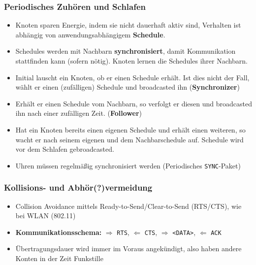 \documentclass{article} %
\begin{document}
\subsubsection{Periodisches Zuhören und Schlafen}
\begin{itemize}
	\item Knoten sparen Energie, indem sie nicht dauerhaft aktiv sind, Verhalten ist abhängig von anwendungsabhängigem \textbf{Schedule}.
	\item Schedules werden mit Nachbarn \textbf{synchronisiert}, damit Kommunikation stattfinden kann (sofern nötig).
	Knoten lernen die Schedules ihrer Nachbarn.
	\item Initial lauscht ein Knoten, ob er einen Schedule erhält.
	Ist dies nicht der Fall, wählt er einen (zufälligen) Schedule und broadcasted ihn (\textbf{Synchronizer})
	\item Erhält er einen Schedule vom Nachbarn, so verfolgt er diesen und broadcasted ihn nach einer zufälligen Zeit. (\textbf{Follower})
	\item Hat ein Knoten bereits einen eigenen Schedule und erhält einen weiteren, so wacht er nach seinem eigenen und dem Nachbarschedule auf.
	Schedule wird vor dem Schlafen gebroadcasted.
	\item Uhren müssen regelmäßig synchronisiert werden (Periodisches \texttt{SYNC}-Paket)
\end{itemize}
\subsubsection{Kollisions- und Abhör(?)vermeidung}
\begin{itemize}
	\item Collision Avoidance mittels Ready-to-Send/Clear-to-Send (RTS/CTS), wie bei WLAN (802.11)
	\item \textbf{Kommunikationsschema:} $\Rightarrow$ \texttt{RTS}, $\Leftarrow$ \texttt{CTS}, $\Rightarrow$ \texttt{<DATA>}, $\Leftarrow$ \texttt{ACK}
	\item Übertragungsdauer wird immer im Voraus angekündigt, also haben andere Konten in der Zeit Funkstille
\end{itemize}
\end{document}
